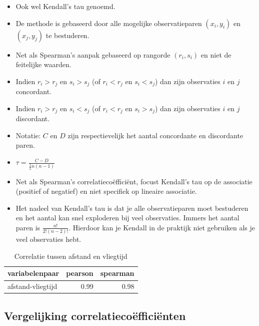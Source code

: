 \documentclass[]{tufte-book}
\providecommand{\tightlist}{%
  \setlength{\itemsep}{0pt}\setlength{\parskip}{0pt}}
\begin{document}
\begin{itemize}
  \begin{itemize}
  \tightlist
  \item
    Ook wel Kendall's tau genoemd.
  \item
    De methode is gebaseerd door alle mogelijke observatieparen \((x_i, y_i)\) en \((x_j,y_j)\) te bestuderen.
  \item
    Net als Spearman's aanpak gebaseerd op rangorde \((r_i, s_i)\) en niet de feitelijke waarden.
  \item
    Indien \(r_i > r_j\) en \(s_i > s_j\) (of \(r_i < r_j\) en \(s_i < s_j\)) dan zijn observaties \(i\) en \(j\) concordant.
  \item
    Indien \(r_i > r_j\) en \(s_i < s_j\) (of \(r_i < r_j\) en \(s_i > s_j\)) dan zijn observaties \(i\) en \(j\) discordant.
  \item
    Notatie: \(C\) en \(D\) zijn respectievelijk het aantal concordante en discordante paren.
  \item
    \(\tau = \frac{C-D}{\frac{1}{2}n(n-1)}\)
  \item
    Net als Spearman's correlatiecoëfficiënt, focust Kendall's tau op de associatie (positief of negatief) en niet specifiek op lineaire associatie.
  \item
    Het nadeel van Kendall's tau is dat je alle observatieparen moet bestuderen en het aantal kan snel exploderen bij veel observaties. Immers het aantal paren is \(\frac{n!}{2!(n-2)!}\). Hierdoor kan je Kendall in de praktijk niet gebruiken als je veel observaties hebt.
  \end{itemize}
\end{itemize}

\begin{table}

\caption{\label{tab:4-12}Correlatie tussen afstand en vliegtijd}
\centering
\fontsize{10}{12}\selectfont
\begin{tabular}[t]{lrr}
\toprule
variabelenpaar & pearson & spearman\\
\midrule
afstand-vliegtijd & 0.99 & 0.98\\
\bottomrule
\end{tabular}
\end{table}

\hypertarget{vergelijking-correlatiecouxebfficiuxebnten}{%
\subsection*{Vergelijking correlatiecoëfficiënten}\label{vergelijking-correlatiecouxebfficiuxebnten}}
\end{document}
